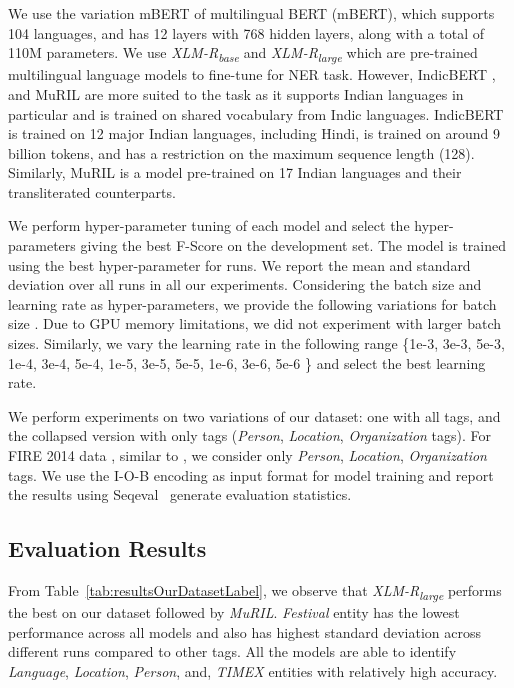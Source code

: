 \documentclass[10pt, a4paper]{article}
\begin{document}
We use the variation mBERT of multilingual BERT (mBERT), which supports 104 languages, and has 12 layers with 768 hidden layers, along with a total of 110M parameters. We use \textit{XLM-R\textsubscript{base}} and \textit{XLM-R\textsubscript{large}} \cite{conneau-etal-2020-unsupervised} which are pre-trained multilingual language models to fine-tune for NER task. However, IndicBERT \cite{kakwani2020inlpsuite}, and MuRIL \cite{khanuja2021muril} are more suited to the task as it supports Indian languages in particular and is trained on shared vocabulary from Indic languages. IndicBERT is trained on 12 major Indian languages, including Hindi, is trained on around 9 billion tokens, and has a restriction on the maximum sequence length (128). Similarly, MuRIL is a model pre-trained on 17 Indian languages and their transliterated counterparts. 

We perform hyper-parameter tuning of each model and select the hyper-parameters giving the best F-Score on the development set. The model is trained using the best hyper-parameter for  runs. We report the mean and standard deviation over all runs in all our experiments. Considering the batch size and learning rate as hyper-parameters, we provide the following variations for batch size . Due to GPU memory limitations, we did not experiment with larger batch sizes. Similarly, we vary the learning rate in the following range \{1e-3, 3e-3, 5e-3, 1e-4, 3e-4, 5e-4, 1e-5, 3e-5, 5e-5, 1e-6, 3e-6, 5e-6 \} and select the best learning rate.

We perform experiments on two variations of our dataset: one with all  tags, and the collapsed version with only  tags (\textit{Person}, \textit{Location}, \textit{Organization} tags). For FIRE 2014 data \cite{FIRE2014}, similar to , we consider only \textit{Person}, \textit{Location}, \textit{Organization} tags. We use the I-O-B encoding as input format for model training and report the results using Seqeval~\cite{seqeval} generate evaluation statistics.







\subsection{Evaluation Results}

From Table~\ref{tab:resultsOurDatasetLabel}, we observe that \textit{XLM-R\textsubscript{large}} performs the best on our dataset followed by \textit{MuRIL}. \textit{Festival} entity has the lowest performance across all models and also has highest standard deviation across different runs compared to other tags. All the models are able to identify \textit{Language}, \textit{Location}, \textit{Person}, and, \textit{TIMEX} entities with relatively high accuracy.
\end{document}
